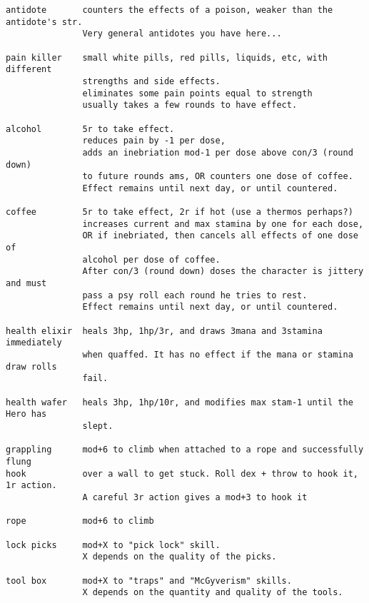 \small
\begin{verbatim}
antidote       counters the effects of a poison, weaker than the antidote's str.
               Very general antidotes you have here...

pain killer    small white pills, red pills, liquids, etc, with different
               strengths and side effects.
               eliminates some pain points equal to strength
               usually takes a few rounds to have effect.

alcohol        5r to take effect.
               reduces pain by -1 per dose,
               adds an inebriation mod-1 per dose above con/3 (round down)
               to future rounds ams, OR counters one dose of coffee.
               Effect remains until next day, or until countered.

coffee         5r to take effect, 2r if hot (use a thermos perhaps?)
               increases current and max stamina by one for each dose,
               OR if inebriated, then cancels all effects of one dose of
               alcohol per dose of coffee.
               After con/3 (round down) doses the character is jittery and must
               pass a psy roll each round he tries to rest.
               Effect remains until next day, or until countered.

health elixir  heals 3hp, 1hp/3r, and draws 3mana and 3stamina immediately
               when quaffed. It has no effect if the mana or stamina draw rolls
               fail.

health wafer   heals 3hp, 1hp/10r, and modifies max stam-1 until the Hero has
               slept.

grappling      mod+6 to climb when attached to a rope and successfully flung
hook           over a wall to get stuck. Roll dex + throw to hook it, 1r action.
               A careful 3r action gives a mod+3 to hook it

rope           mod+6 to climb

lock picks     mod+X to "pick lock" skill.
               X depends on the quality of the picks.

tool box       mod+X to "traps" and "McGyverism" skills.
               X depends on the quantity and quality of the tools.

\end{verbatim} \pagebreak[3]



